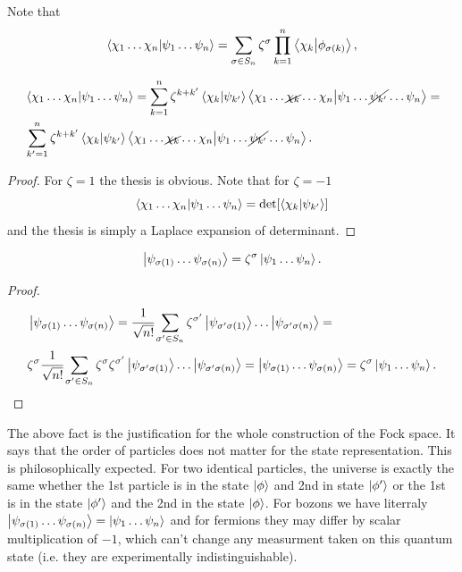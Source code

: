 \documentclass[main.tex]{subfiles}
\begin{document}
Note that
\begin{equation}
\bra{\chi_1\dots\chi_n} \ket{\psi_1 \dots \psi_n} =
 \sum_{\sigma\in S_n}  \zeta^\sigma
\prod_{k=1}^n \bra{\chi_{k}}\ket{\phi_{\sigma(k)}},
\end{equation}

\begin{proposition}
\label{laplace-expansion}
\begin{align*}
&\bra{\chi_1\dots\chi_n} \ket{\psi_1 \dots \psi_n} = \sum_{k=1}^n \zeta^{k + k'}
\bra{\chi_k}\ket{\psi_{k'}}
\bra{\chi_1\dots\cancel{\chi_k}\dots\chi_n}\ket{\psi_1 \dots \cancel{\psi_{k'}} \dots \psi_n} = \\ 
& \sum_{k'=1}^n \zeta^{k + k'}
\bra{\chi_k}\ket{\psi_{k'}}
\bra{\chi_1\dots\cancel{\chi_k}\dots\chi_n}\ket{\psi_1 \dots \cancel{\psi_{k'}} \dots \psi_n}.
\end{align*}
\begin{proof}
For $\zeta = 1$ the thesis is obvious. Note that for $\zeta = -1$
\begin{equation}
\bra{\chi_1\dots\chi_n} \ket{\psi_1 \dots \psi_n} = \det[ \bra{\chi_k}\ket{\psi_{k'}} ]
\end{equation}
and the thesis is simply a Laplace expansion of determinant.
\end{proof}
\end{proposition}

\begin{fact}
\begin{equation}
\label{fock-justification}
\ket{\psi_{\sigma(1)} \dots \psi_{\sigma(n)}} = \zeta^\sigma \ket{\psi_1 \dots \psi_n}.
\end{equation}
\end{fact}
\begin{proof}
\begin{align*}
&\ket{\psi_{\sigma(1)} \dots \psi_{\sigma(n)}} = \cfrac{1}{\sqrt{n!}}\sum_{\sigma'\in S_n} \zeta^{\sigma'} 
\ket{\psi_{\sigma'\sigma(1)}} \dots \ket{\psi_{\sigma'\sigma(n)}} = \\
& \zeta^\sigma \cfrac{1}{\sqrt{n!}}\sum_{\sigma'\in S_n}\zeta^\sigma \zeta^{\sigma'} 
\ket{\psi_{\sigma'\sigma(1)}} \dots \ket{\psi_{\sigma'\sigma(n)}} = 
\ket{\psi_{\sigma(1)} \dots \psi_{\sigma(n)}} = \zeta^\sigma \ket{\psi_1 \dots \psi_n}.
\end{align*}
\end{proof}

The above fact is the justification for the whole construction of the Fock space. It says that the order of particles does not matter for the state representation. This is philosophically expected. For two identical particles, the universe is exactly the same whether the 1st particle is in the state $\ket{\phi}$ and 2nd in state $\ket{\phi'}$ or the 1st is in the state $\ket{\phi'}$ and the 2nd in the state $\ket{\phi}$. For bozons we have literraly $\ket{\psi_{\sigma(1)} \dots \psi_{\sigma(n)}} = \ket{\psi_1 \dots \psi_n}$ and for fermions they may differ by scalar multiplication of $-1$, which can't change any measurment taken on this quantum state (i.e. they are experimentally indistinguishable). 
\end{document}
